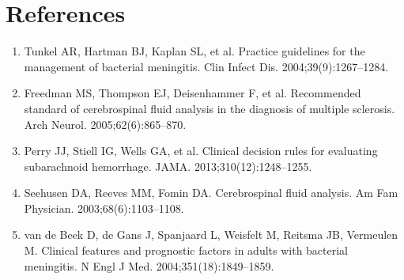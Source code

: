 \section*{References}
\begin{enumerate}
  \item Tunkel AR, Hartman BJ, Kaplan SL, et al. Practice guidelines for the management of bacterial meningitis. Clin Infect Dis. 2004;39(9):1267--1284.
  \item Freedman MS, Thompson EJ, Deisenhammer F, et al. Recommended standard of cerebrospinal fluid analysis in the diagnosis of multiple sclerosis. Arch Neurol. 2005;62(6):865--870.
  \item Perry JJ, Stiell IG, Wells GA, et al. Clinical decision rules for evaluating subarachnoid hemorrhage. JAMA. 2013;310(12):1248--1255.
  \item Seehusen DA, Reeves MM, Fomin DA. Cerebrospinal fluid analysis. Am Fam Physician. 2003;68(6):1103--1108.
  \item van de Beek D, de Gans J, Spanjaard L, Weisfelt M, Reitsma JB, Vermeulen M. Clinical features and prognostic factors in adults with bacterial meningitis. N Engl J Med. 2004;351(18):1849--1859.
\end{enumerate}
\clearpage
